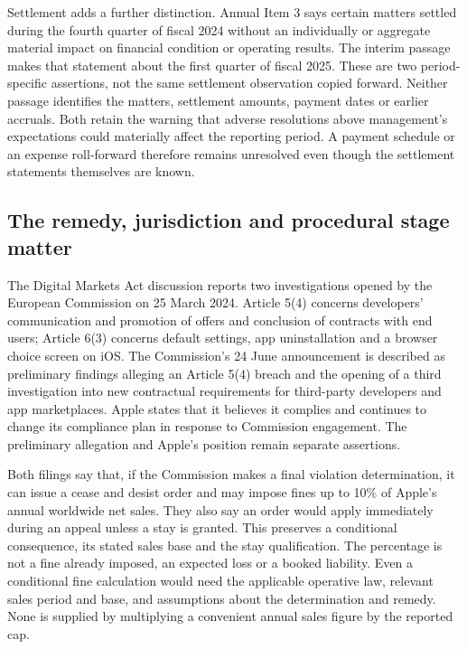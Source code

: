 Settlement adds a further distinction. Annual Item 3 says certain matters
settled during the fourth quarter of fiscal 2024 without an individually or
aggregate material impact on financial condition or operating results. The
interim passage makes that statement about the first quarter of fiscal 2025.
These are two period-specific assertions, not the same settlement observation
copied forward. Neither passage identifies the matters, settlement amounts,
payment dates or earlier accruals. Both retain the warning that adverse
resolutions above management's expectations could materially affect the
reporting period. A payment schedule or an expense roll-forward therefore
remains unresolved even though the settlement statements themselves are known.

\subsection{The remedy, jurisdiction and procedural stage matter}

The Digital Markets Act discussion reports two investigations opened by the
European Commission on 25 March 2024. Article 5(4) concerns developers'
communication and promotion of offers and conclusion of contracts with end
users; Article 6(3) concerns default settings, app uninstallation and a browser
choice screen on iOS. The Commission's 24 June announcement is described as
preliminary findings alleging an Article 5(4) breach and the opening of a third
investigation into new contractual requirements for third-party developers
and app marketplaces. Apple states that it believes it complies and continues
to change its compliance plan in response to Commission engagement. The
preliminary allegation and Apple's position remain separate assertions.

Both filings say that, if the Commission makes a final violation determination,
it can issue a cease and desist order and may impose fines up to 10\% of
Apple's annual worldwide net sales. They also say an order would apply
immediately during an appeal unless a stay is granted. This preserves a
conditional consequence, its stated sales base and the stay qualification.
The percentage is not a fine already imposed, an expected loss or a booked
liability. Even a conditional fine calculation would need the applicable
operative law, relevant sales period and base, and assumptions about the
determination and remedy. None is supplied by multiplying a convenient annual
sales figure by the reported cap.

